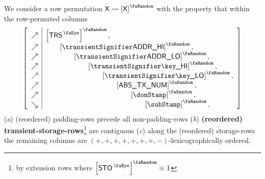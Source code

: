 We consider a row permutation $\col{X}\rightsquigarrow\order{\col{X}}$ with the property that within the row-permuted columns
\[
	\left[ \begin{array}{c|l}
		\nearrow   & \order{\peekTransient}, \\
		\nearrow   & \quad\quad \order{\transAddressHi}, \\
		\nearrow   & \quad\quad \quad\quad \order{\transAddressLo}, \\
		\nearrow   & \quad\quad \quad\quad \quad\quad \order{\transKeyHi}, \\
		\nearrow   & \quad\quad \quad\quad \quad\quad \quad\quad \order{\transKeyLo}, \\
		\nearrow   & \quad\quad \quad\quad \quad\quad \quad\quad \quad\quad \order{\absTxNum}, \\
		\nearrow   & \quad\quad \quad\quad \quad\quad \quad\quad \quad\quad \quad\quad \order{\domStamp}, \\
		\searrow & \quad\quad \quad\quad \quad\quad \quad\quad \quad\quad \quad\quad \quad\quad \order{\subStamp}, \\
	\end{array} \right]
\]
\noindent
(\emph{a}) (reordered) padding-rows precede all non-padding-rows
(\emph{b}) \textbf{(reordered) transient-storage-rows}\footnote{by extension rows where $\order{\peekStorage} \equiv 1$} are contiguous
(\emph{c}) along the (reordered) storage-rows the remaining columns are $(+, +, +, +, +, +, +, -)$-lexicographically ordered.
